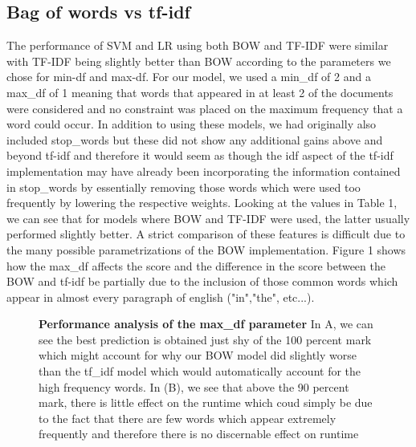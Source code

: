 \documentclass{amsart}
\theoremstyle{definition}
\theoremstyle{remark}
\numberwithin{equation}{section}
\begin{document}
 \subsection{Bag of words vs tf-idf}
The performance of SVM and LR using both BOW and TF-IDF were similar with TF-IDF being slightly better than BOW according to the parameters we chose for min-df and max-df.  For our model, we used a min\_df of 2 and a max\_df of 1 meaning that words that appeared in at least 2 of the documents were considered and no constraint was placed on the maximum frequency that a word could occur.  In addition to using these models, we had originally also included stop\_words but these did not show any additional gains above and beyond tf-idf and therefore it would seem as though the idf aspect of the tf-idf implementation may have already been incorporating the information contained in stop\_words by essentially removing those words which were used too frequently by lowering the respective weights.  Looking at the values in Table 1, we can see that for models where BOW and TF-IDF were used, the latter usually performed slightly better.  A strict comparison of these features is difficult due to the many possible parametrizations of the BOW implementation.  Figure 1 shows how the max\_df affects the score and the difference in the score between the BOW and tf-idf be partially due to the inclusion of those common words which appear in almost every paragraph of english ("in","the", etc...).
\begin{figure}
	\centering
	\qquad
	\caption{\textbf{Performance analysis of the max\_df parameter}  In A,  we can see the best prediction is obtained just shy of the 100 percent mark which might account for why our BOW model did slightly worse than the tf\_idf model which would automatically account for the high frequency words.  In (B), we see that above the 90 percent mark, there is little effect on the runtime which coud simply be due to the fact that there are few words which appear extremely frequently and therefore there is no discernable effect on runtime}
	\label{fig:betavsMSE}
\end{figure}
\end{document}
